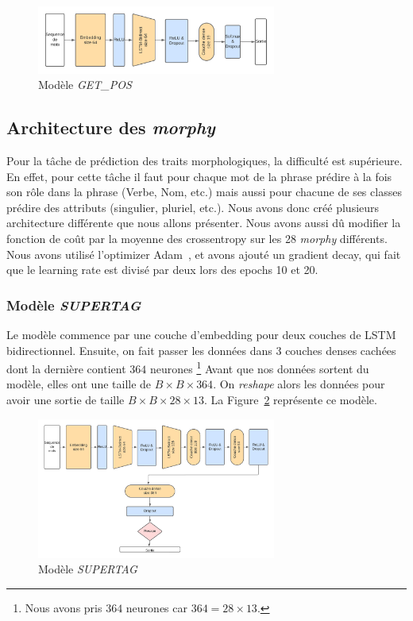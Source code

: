 \documentclass[a4paper]{article}
\begin{document}
\begin{figure}[H]
    \centering
    \includegraphics[width=0.7\textwidth]{get_pos.png}
    \caption{Modèle \textit{GET\_POS}}
    \label{fig: model getpos}
\end{figure} 

\subsection{Architecture des \textit{morphy}}

Pour la tâche de prédiction des traits morphologiques, la difficulté est supérieure. En effet, pour cette tâche 
il faut pour chaque mot de la phrase prédire à la fois son rôle dans la phrase (Verbe, Nom, etc.) mais aussi 
pour chacune de ses classes prédire des attributs (singulier, pluriel, etc.). Nous avons donc créé plusieurs 
architecture différente que nous allons présenter. Nous avons aussi dû modifier la fonction de coût par 
la moyenne des crossentropy sur les 28 \textit{morphy} différents. Nous avons utilisé l'optimizer Adam~\cite{kingma2014adam},
et avons ajouté un gradient decay, qui fait que le learning rate est divisé par deux lors des epochs 10 et 20.

\subsubsection{Modèle \textit{SUPERTAG}}

Le modèle commence par une couche d'embedding pour deux couches de LSTM bidirectionnel. Ensuite, on fait passer les données 
dans 3 couches denses cachées dont la dernière contient $364$ neurones
\footnote{Nous avons pris $364$ neurones car $364 = 28 \times 13$.}
Avant que nos données sortent du modèle, elles ont une
taille de $B \times B \times 364$. On \textit{reshape} alors les données pour avoir une sortie de taille 
$B \times B \times 28 \times 13$. La Figure~\ref{fig: model supertag} représente ce modèle.

\begin{figure}[H]
    \centering
    \includegraphics[width=0.7\textwidth]{get_morphy_supertag.png}
    \caption{Modèle \textit{SUPERTAG}}
    \label{fig: model supertag}
\end{figure}
\end{document}
